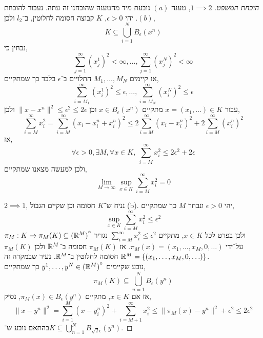 \begin{proof}[הוכחת המשפט]
	$1 \implies 2$, טענה $(a)$ נובעת מיד מהטענה שהוכחנו זה עתה.
	נעבור להוכחת $(b)$.
	יהי $\epsilon > 0$, $K$ קבוצה חסומה לחלוטין, ב־$l_2$ ולכן,
	\[
		K
		\subseteq \bigcup_{i = 1}^N B_{\epsilon}(x^n)
	\] 
	נבחין כי,
	\[
		\sum_{j = 1}^\infty {(x_j^1)}^2 < \infty
		, \ldots, 
		\sum_{j = 1}^\infty {(x_j^N)}^2 < \infty
	\] 
	אז קיימים $M_1, \ldots, M_N$ התלויים ב־$\epsilon$ בלבד כך שמתקיים,
	\[
		\sum_{i = M_1}^\infty {(x_i^1)}^2 \le \epsilon
		, \ldots, 
		\sum_{i = M_N}^\infty {(x_i^N)}^2 \le \epsilon
	\] 
	עבור $x = (x_1, \ldots) \in K$ מתקיים $x \in B_{\epsilon}(x^n)$ וכן $\lVert x - x^n \rVert^2 \le \epsilon^2 \le 2 \epsilon$ ולכן,
	\[
		\sum_{i = M}^\infty x_i^2
		= \sum_{i = M}^\infty {(x_i - x_i^n + x_i^n)}^2
		\le 2 \sum_{i = M}^\infty {(x_i - x_i^n)}^2 + 2 \sum_{i = M}^\infty {(x_i^n)}^2
	\]
	אז,
	\[
		\forall \epsilon > 0,
		\exists M,
		\forall x \in K,
		\ \sum_{i = M}^\infty x_i^2
		\le 2 \epsilon^2 + 2 \epsilon
	\] 
	ולכן למעשה מצאנו שמתקיים,
	\[
		\lim_{M \to \infty} \sup_{x \in K} \sum_{i = M}^\infty x_i^2 = 0
	\] 

	$2 \implies 1$,
	נניח ש־$K$ חסומה וכן שקיים הגבול (b).
	יהי $\epsilon > 0$ ונבחר $M$ כך שמתקיים,
	\[
		\sup_{x \in K} \sum_{i = M}^\infty x_i^2
		\le \epsilon^2
	\] 
	ולכן בפרט לכל $x \in K$, מתקיים $\sum_{i = M}^\infty x_i^2 \le \epsilon^2$
	נגדיר $\pi_M : K \to \pi_M(K) \subseteq {(\mathbb{R}^M)}^\circ$ על־ידי $\pi_M(x) = (x_1, \ldots, x_M, 0, \ldots)$.
	אז $\pi_M(K)$ חסומה ב־$\mathbb{R}^M$ ולכן $\pi_M(K)$ חסומה לחלוטין ב־$\mathbb{R}^M$.
	נעיר שבמקרה זה $\mathbb{R}^M = \{ (x_1, \ldots, x_M, 0, \ldots) \}$. \\
	נובע שקיימים $y^1, \ldots, y^N \in {(\mathbb{R}^M)}^\circ$ כך שמתקיים,
	\[
		\pi_M(K)
		\subseteq \bigcup_{n = 1}^N B_{\epsilon}(y^n)
	\]
	אז אם $x \in K$, מתקיים $\pi_M(x) \in B_{\epsilon}(y^n)$, נסיק,
	\[
		\lVert x - y^n \rVert^2
		= \sum_{i = 1}^M {(x - y_i^n)}^2 + \sum_{i = M + 1}^\infty x_i^2 
		\le \lVert \pi_M(x) - y^n \rVert^2 + \epsilon^2
		\le 2 \epsilon^2
	\]
	בהתאם נובע ש־$K \subseteq \bigcup_{n = 1}^N B_{\sqrt{2} \epsilon}(y^n)$.
\end{proof}

